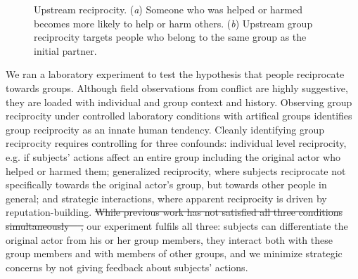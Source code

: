 \documentclass[12pt,a4paper]{article}
\providecommand{\DIFdeltex}[1]{{\protect\color{red}\sout{#1}}}                      %
\providecommand{\DIFaddbegin}{} %
\providecommand{\DIFdelbegin}{} %
\providecommand{\DIFdelend}{} %
\providecommand{\DIFdel}[1]{\texorpdfstring{\DIFdeltex{#1}}{}} %
\begin{document}
\begin{figure}
\begin{center}
\begin{subfigure}[b]{0.4\textwidth}
            \caption{}\label{group}
        \end{subfigure}
        \caption{Upstream reciprocity. (\textit{a}) Someone who was helped or harmed becomes more likely to help or harm others. (\textit{b})
    Upstream group reciprocity targets people who belong to
    the same group as the initial partner.}
        \label{fig:illustration}
	\end{center}
\end{figure}

We ran a laboratory experiment to test the hypothesis that people reciprocate towards groups. Although field observations from conflict are highly suggestive, they are loaded with individual and group context and history. Observing group reciprocity under controlled laboratory conditions with artifical groups identifies group reciprocity as an innate human tendency.
Cleanly identifying group reciprocity requires controlling for three confounds: individual level reciprocity, e.g. if subjects' actions affect an entire group including the original actor who helped or harmed them; generalized reciprocity, where subjects reciprocate not specifically towards the original actor’s group, but towards other people in general; and strategic interactions, where apparent reciprocity is driven by reputation-building. 
\DIFdelbegin \DIFdel{While previous work has not satisfied all three conditions simultaneously
\mbox{%
\citep{gaertner2008whenrejection,stenstrom2008theroles,hugh-jones2013intergroup}}%
, }\DIFdelend our experiment fulfils all three: subjects can differentiate the original actor from his or her group members, they interact both with these group members and with members of other groups, and we minimize strategic concerns by not giving feedback about subjects' actions.

\DIFaddbegin 
\end{document}
